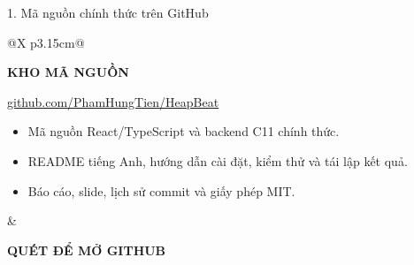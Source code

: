 \documentclass[11pt,a4paper]{article}
\begin{document}
\vspace{0.14cm}
\begin{accessbox}{1. Mã nguồn chính thức trên GitHub}
\begin{tabularx}{\linewidth}{@{}X p{3.15cm}@{}}
\begin{minipage}[t]{\linewidth}
{\small\bfseries\color{hbgreen}KHO MÃ NGUỒN\par}
\vspace{0.06cm}
{\normalsize\href{https://github.com/PhamHungTien/HeapBeat}{github.com/PhamHungTien/HeapBeat}\par}
\vspace{0.14cm}
{\small
\begin{itemize}
  \item Mã nguồn React/TypeScript và backend C11 chính thức.
  \item README tiếng Anh, hướng dẫn cài đặt, kiểm thử và tái lập kết quả.
  \item Báo cáo, slide, lịch sử commit và giấy phép MIT.
\end{itemize}}
\end{minipage}
&
\begin{minipage}[t]{\linewidth}
\centering
\href{https://github.com/PhamHungTien/HeapBeat}{%
  }
\par\vspace{0.08cm}
{\scriptsize\bfseries\color{hbgreen}QUÉT ĐỂ MỞ GITHUB\par}
\end{minipage}
\end{tabularx}
\end{accessbox}
\end{document}
